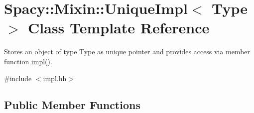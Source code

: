 \hypertarget{classSpacy_1_1Mixin_1_1UniqueImpl}{}\section{Spacy\+:\+:Mixin\+:\+:Unique\+Impl$<$ Type $>$ Class Template Reference}
\label{classSpacy_1_1Mixin_1_1UniqueImpl}


Stores an object of type Type as unique pointer and provides access via member function \hyperlink{classSpacy_1_1Mixin_1_1UniqueImpl_ae183ae8b045db161111f761a32703547}{impl()}.  




{\ttfamily \#include $<$impl.\+hh$>$}

\subsection*{Public Member Functions}
